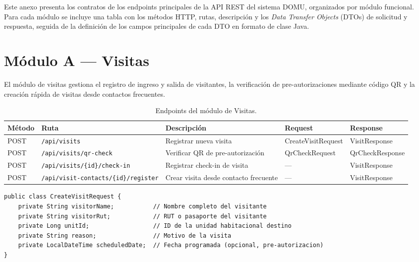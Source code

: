 
Este anexo presenta los contratos de los endpoints principales de la API REST del sistema DOMU, organizados por módulo funcional. Para cada módulo se incluye una tabla con los métodos HTTP, rutas, descripción y los \textit{Data Transfer Objects} (DTOs) de solicitud y respuesta, seguida de la definición de los campos principales de cada DTO en formato de clase Java.

\section{Módulo A --- Visitas}

El módulo de visitas gestiona el registro de ingreso y salida de visitantes, la verificación de pre-autorizaciones mediante código QR y la creación rápida de visitas desde contactos frecuentes.

\begin{table}[H]
\centering
\small
\begin{tabular}{|p{}|p{}|p{}|p{}|p{}|}
\hline
\textbf{Método} & \textbf{Ruta} & \textbf{Descripción} & \textbf{Request} & \textbf{Response} \\\hline
POST & \texttt{/api/visits} & Registrar nueva visita & CreateVisit\-Request & Visit\-Response \\\hline
POST & \texttt{/api/visits/qr-check} & Verificar QR de pre-autorización & QrCheck\-Request & QrCheck\-Response \\\hline
POST & \texttt{/api/visits/\{id\}/check-in} & Registrar check-in de visita & --- & Visit\-Response \\\hline
POST & \texttt{/api/visit-contacts/\{id\}/register} & Crear visita desde contacto frecuente & --- & Visit\-Response \\\hline
\end{tabular}
\caption{Endpoints del módulo de Visitas.}
\label{tab:endpoints-visitas}
\end{table}

\begin{lstlisting}[style=javadto, title={\texttt{CreateVisitRequest}}]
public class CreateVisitRequest {
    private String visitorName;           // Nombre completo del visitante
    private String visitorRut;            // RUT o pasaporte del visitante
    private Long unitId;                  // ID de la unidad habitacional destino
    private String reason;                // Motivo de la visita
    private LocalDateTime scheduledDate;  // Fecha programada (opcional, pre-autorizacion)
}
\end{lstlisting}

